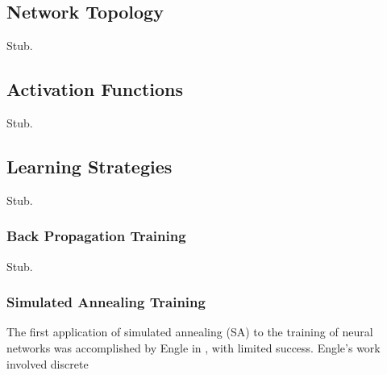 \documentclass[11pt]{afthesis}
\begin{document}
	
	
	
	
	\subsection{Network Topology}
	
	Stub.
	
	\subsection{Activation Functions}
	
	Stub.
	
	
	\subsection{Learning Strategies}
	
	Stub.
	
	
	
	
	\subsubsection{Back Propagation Training} \label{sec:backpropTraining}
	Stub.
	
	
	
	

	\subsubsection{Simulated Annealing Training} 
	
	
	The first application of simulated annealing (SA) to the training of neural networks was accomplished by Engle in \cite{engel1988teachingfeedforwardnueralnetsbysa}, with limited success. Engle's work involved discrete
	
\end{document}
